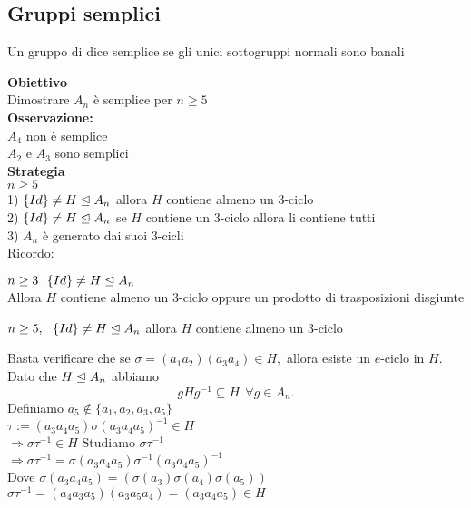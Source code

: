 \documentclass[12px]{article}
\begin{document}
{\subsection{Gruppi semplici}
\begin{defi}
		Un gruppo di dice semplice se gli unici sottogruppi normali sono banali
	\end{defi}
	\textbf{Obiettivo}\\
	Dimostrare $A_n$ è semplice per  $n \geq 5$\\
	\textbf{Osservazione:}\\
	$A_4$ non è semplice\\
	$A_2$ e $A_3$ sono semplici\\
	\textbf{Strategia}\\
	$n \geq 5$\\
	1)  $\{Id\} \neq H\trianglelefteq A_n$ allora  $H$ contiene almeno un $3$-ciclo\\
	2) $\{Id\}\neq H\trianglelefteq A_n$ se $H$ contiene un $3$-ciclo allora li contiene tutti\\
	3) $A_n$ è generato dai suoi $3$-cicli\\
	Ricordo:
	\newpage
	\begin{lemm}
		$n\geq 3 \ \ \{Id\}\neq H\trianglelefteq A_n$\\
		Allora $H$ contiene almeno un $3$-ciclo oppure un prodotto di trasposizioni disgiunte
	\end{lemm}
	\begin{prop}
		$n\geq 5, \ \ \{Id\}\neq H\trianglelefteq A_n$ allora $H$ contiene almeno un $3$-ciclo
	\end{prop}
	\begin{dimo}
		Basta verificare che se $\sigma = (a_1a_2)(a_3a_4)\in H, $ allora esiste un $e$-ciclo in $H$.\\
		Dato che  $H\trianglelefteq A_n$ abbiamo 
		\[
			gHg^{-1}\subseteq H \ \ \forall g\in A_n
		.\] 
		Definiamo $a_5 \not\in \{a_1,a_2,a_3,a_5\}$\\
		$\tau := (a_3a_4a_5)\sigma(a_3a_4a_5)^{-1}\in H$\\
		$ \Rightarrow \sigma \tau^{-1}\in H$ Studiamo $\sigma\tau^{-1}$\\
		$ \Rightarrow \sigma\tau^{-1} = \sigma(a_3a_4a_5)\sigma^{-1}(a_3a_4a_5)^{-1}$ \\
		Dove  $\sigma(a_3a_4a_5) = (\sigma(a_3)\sigma(a_4)\sigma(a_5))$\\
		$\sigma\tau^{-1} = (a_4a_3a_5)(a_3a_5a_4) = (a_3a_4a_5)\in H$
	\end{dimo}
	\begin{teo}

\end{teo}}
\end{document}

